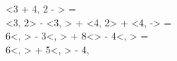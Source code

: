 <3 + 4, 2 - > =\\
<3, 2> - <3, > +
<4, 2> + <4, -> = \\
6<, > - 3<, > + 8<> -
4<, > = \\
6<, > + 5<, > - 4{, }